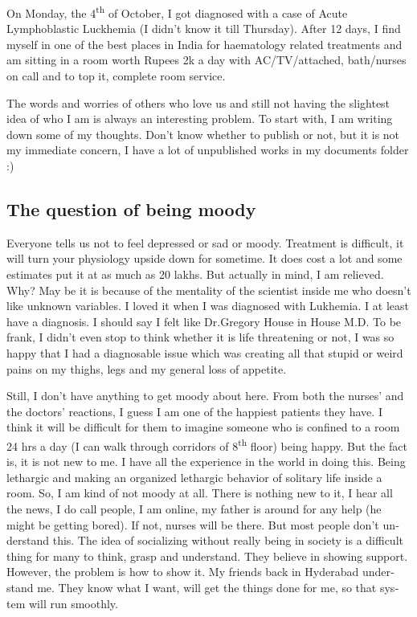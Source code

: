 \vskip 2pt
\begin{english}
On Monday, the 4\textsuperscript{th} of October, I got diagnosed with a case of Acute Lymphoblastic Luckhemia 
(I didn't know it till Thursday). After 12 days, I find myself in one of the best places in
 India for haematology related treatments and am sitting in a room worth Rupees 2k a day
 with AC/TV/attached, bath/nurses on call and to top it, complete room service.

The words and worries of others who love us and still not having the slightest idea of
who I am is always an interesting problem. To start with, I am writing down some of
my thoughts. Don't know whether to publish or not, but it is not my immediate concern,
I have a lot of unpublished works in my documents folder :)

\subsection*{The question of being moody} 

Everyone tells us not to feel depressed or sad or moody. Treatment is difficult, it 
will turn your physiology upside down for sometime. It does cost a lot and some 
estimates put it at as much as 20 lakhs. But actually in mind, I am relieved. Why? May 
be it is because of the mentality of the scientist inside me who doesn't like unknown variables. I loved
it when I was diagnosed with Lukhemia. I at least have a diagnosis. I should say I 
felt like Dr.Gregory House in House M.D. To be frank, I didn't even stop to think whether
it is life threatening or not, I was so happy that I had a diagnosable issue which was 
creating all that stupid or weird pains on my thighs, legs and my general loss of appetite.

Still, I don't have anything to get moody about here. From both the nurses' and the doctors' reactions, I guess
I am one of the happiest patients they have. I think it will be difficult for them to 
imagine someone who is confined to a room 24 hrs a day (I can walk through corridors of
8\textsuperscript{th} floor) being happy. But the fact is, it is not new to me. I have all the experience in 
the world in doing this. Being lethargic and making an organized lethargic behavior of
solitary life inside a room. So, I am kind of not moody at all. There is nothing new to it,
I hear all the news, I do call people, I am online, my father is around for any help (he might
be getting bored). If not, nurses will be there. But most people don't understand this. The
idea of socializing without really being in society is a difficult thing for many to think, 
grasp and understand. They believe in showing support. However, the problem is how to show it. My 
friends back in Hyderabad understand me. They know what I want, will get the things done for
me, so that system will run smoothly. 


\end{english}
